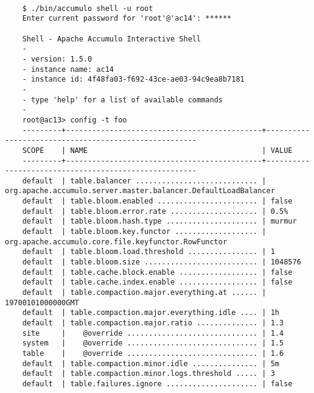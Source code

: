 \begingroup\fontsize{8pt}{8pt}\selectfont\begin{verbatim}

    $ ./bin/accumulo shell -u root
    Enter current password for 'root'@'ac14': ******

    Shell - Apache Accumulo Interactive Shell
    -
    - version: 1.5.0
    - instance name: ac14
    - instance id: 4f48fa03-f692-43ce-ae03-94c9ea8b7181
    -
    - type 'help' for a list of available commands
    -
    root@ac13> config -t foo
    ---------+---------------------------------------------+------------------------------------------------------
    SCOPE    | NAME                                        | VALUE
    ---------+---------------------------------------------+------------------------------------------------------
    default  | table.balancer ............................ | org.apache.accumulo.server.master.balancer.DefaultLoadBalancer
    default  | table.bloom.enabled ....................... | false
    default  | table.bloom.error.rate .................... | 0.5%
    default  | table.bloom.hash.type ..................... | murmur
    default  | table.bloom.key.functor ................... | org.apache.accumulo.core.file.keyfunctor.RowFunctor
    default  | table.bloom.load.threshold ................ | 1
    default  | table.bloom.size .......................... | 1048576
    default  | table.cache.block.enable .................. | false
    default  | table.cache.index.enable .................. | false
    default  | table.compaction.major.everything.at ...... | 19700101000000GMT
    default  | table.compaction.major.everything.idle .... | 1h
    default  | table.compaction.major.ratio .............. | 1.3
    site     |    @override .............................. | 1.4
    system   |    @override .............................. | 1.5
    table    |    @override .............................. | 1.6
    default  | table.compaction.minor.idle ............... | 5m
    default  | table.compaction.minor.logs.threshold ..... | 3
    default  | table.failures.ignore ..................... | false

\end{verbatim}\endgroup

